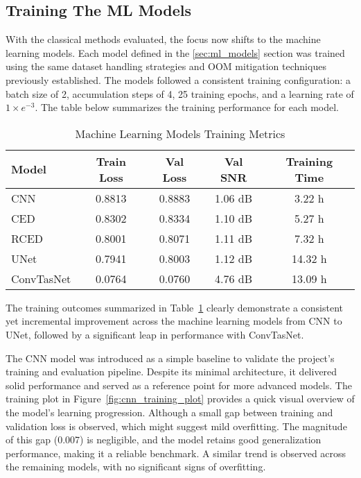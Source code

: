 \subsection{Training The ML Models}
\label{sec:training_ml_models}

With the classical methods evaluated, the focus now shifts to the machine learning models. Each model defined in the \ref{sec:ml_models} section was trained using the same dataset handling strategies and OOM mitigation techniques previously established. The models followed a consistent training configuration: a batch size of 2, accumulation steps of 4, 25 training epochs, and a learning rate of $1 \times e^{-3}$. The table below summarizes the training performance for each model.

\vspace{1em}
\begin{table}[H]
\centering
\caption{Machine Learning Models Training Metrics}
\label{tab:ml_training}
\begin{tabular}{|l|c|c|c|c|}
\hline
\textbf{Model} & \textbf{Train Loss} & \textbf{Val Loss} & \textbf{Val SNR} & \textbf{Training Time} \\
\hline
CNN         & 0.8813 & 0.8883 & 1.06 dB & 3.22 h \\
CED         & 0.8302 & 0.8334 & 1.10 dB & 5.27 h \\
RCED        & 0.8001 & 0.8071 & 1.11 dB & 7.32 h \\
UNet        & 0.7941 & 0.8003 & 1.12 dB & 14.32 h \\
ConvTasNet  & 0.0764 & 0.0760 & 4.76 dB & 13.09 h \\
\hline
\end{tabular}
\end{table}

The training outcomes summarized in Table~\ref{tab:ml_training} clearly demonstrate a consistent yet incremental improvement across the machine learning models from CNN to UNet, followed by a significant leap in performance with ConvTasNet.  

The CNN model was introduced as a simple baseline to validate the project’s training and evaluation pipeline. Despite its minimal architecture, it delivered solid performance and served as a reference point for more advanced models. The training plot in Figure~\ref{fig:cnn_training_plot} provides a quick visual overview of the model's learning progression. Although a small gap between training and validation loss is observed, which might suggest mild overfitting. The magnitude of this gap (0.007) is negligible, and the model retains good generalization performance, making it a reliable benchmark. A similar trend is observed across the remaining models, with no significant signs of overfitting.

